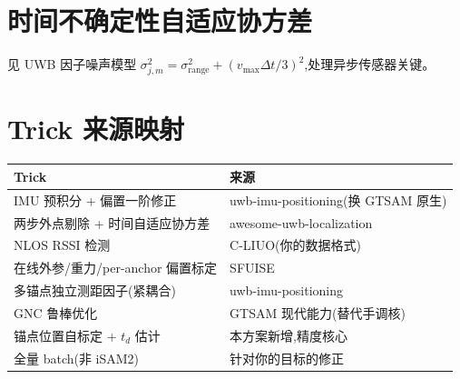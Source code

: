 \documentclass[11pt,a4paper]{report}
\begin{document}
\section{时间不确定性自适应协方差}
见 UWB 因子噪声模型 $\sigma_{j,m}^2=\sigma_{\text{range}}^2+(v_{\max}\Delta t/3)^2$,处理异步传感器关键。

\section{Trick 来源映射}
\begin{longtable}{p{6cm} p{7cm}}
\toprule
Trick & 来源 \\
\midrule
IMU 预积分 + 偏置一阶修正 & uwb-imu-positioning(换 GTSAM 原生) \\
两步外点剔除 + 时间自适应协方差 & awesome-uwb-localization \\
NLOS RSSI 检测 & C-LIUO(你的数据格式) \\
在线外参/重力/per-anchor 偏置标定 & SFUISE \\
多锚点独立测距因子(紧耦合) & uwb-imu-positioning \\
GNC 鲁棒优化 & GTSAM 现代能力(替代手调核) \\
锚点位置自标定 + $t_d$ 估计 & 本方案新增,精度核心 \\
全量 batch(非 iSAM2) & 针对你的目标的修正 \\
\bottomrule
\end{longtable}

\end{document}
